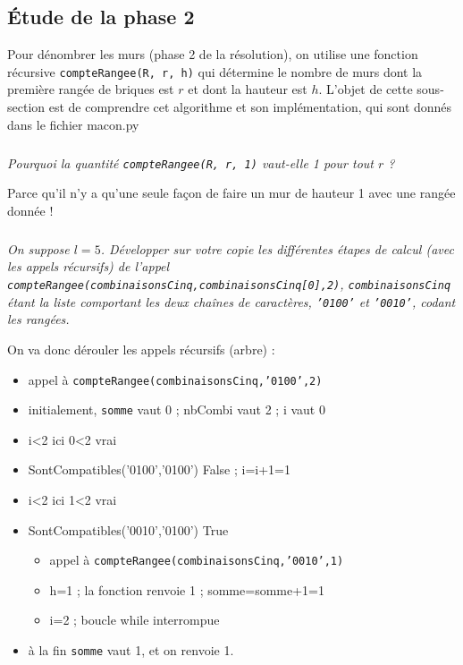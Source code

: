 \subsection*{\'Etude de la phase 2}
\label{ssec:phase2}

Pour dénombrer les murs (phase 2 de la résolution), on utilise une fonction récursive \texttt{compteRangee(R, r, h)}
qui détermine le nombre de murs dont la première rangée de briques est $r$ et dont la hauteur est $h$.
L'objet de cette sous-section est de comprendre cet algorithme et son implémentation, qui sont donnés dans le fichier macon.py%

\subparagraph{}\textit{Pourquoi la quantité \texttt{compteRangee(R, r, 1)} vaut-elle 1 pour tout $r$ ?}


\ifprof
\begin{corrige}
Parce qu'il n'y a qu'une seule façon de faire un mur de hauteur 1 avec une rangée donnée !
\end{corrige}
\else
\fi


\subparagraph{}\textit{On suppose $l = 5$. Développer sur votre copie les différentes étapes de calcul (avec les
appels récursifs) de l'appel \texttt{compteRangee(combinaisonsCinq,combinaisonsCinq[0],2)}, \texttt{combinaisonsCinq} étant la liste comportant les deux chaînes de caractères, \texttt{'0100'} et \texttt{'0010'}, codant les rangées.
}

\ifprof
\begin{corrige}
On va donc dérouler les appels récursifs (arbre) :
\begin{itemize}
\item appel à \texttt{compteRangee(combinaisonsCinq,'0100',2)}
\item initialement, \texttt{somme} vaut 0 ; nbCombi vaut 2 ; i vaut 0
\item i<2 ici 0<2 vrai
\item SontCompatibles('0100','0100') False ; i=i+1=1
\item i<2 ici 1<2 vrai
\item SontCompatibles('0010','0100') True
\begin{itemize}
\item appel à \texttt{compteRangee(combinaisonsCinq,'0010',1)}
\item h=1 ; la fonction renvoie 1 ; somme=somme+1=1
\item i=2 ; boucle while interrompue
\end{itemize}
\item à la fin \texttt{somme} vaut 1, et on renvoie 1.
\end{itemize}
\end{corrige}
\else
\fi
%
%




